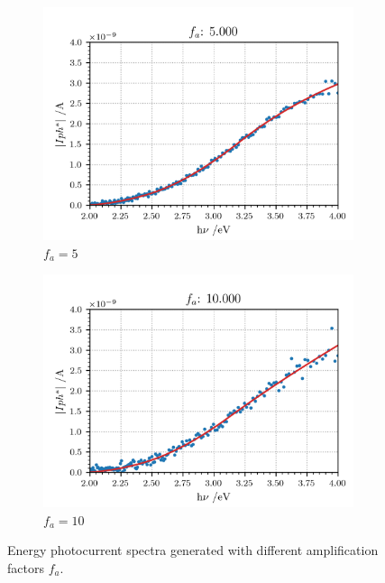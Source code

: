\documentclass[10pt, 3p, sort&compress]{elsarticle}
\newcommand{\coef}{0.1}
\begin{document}
\begin{figure}[htbp]
	\begin{subfigure}{\coef\textwidth}
		\centering
	 	\includegraphics[width=\textwidth]{DSS_0mV_data-Iph-5x.png}
	 	\caption{$f_a=5$}
	 	\label{fig:fa5}
	\end{subfigure}\quad
	\begin{subfigure}{\coef\textwidth}
		\centering
	 	\includegraphics[width=\textwidth]{DSS_0mV_data-Iph-10x.png}
	 	\caption{$f_a=10$}
	 	\label{fig:fa10}
	\end{subfigure}
	\caption{Energy photocurrent spectra generated with different amplification factors $f_a$.}
	\label{fig:data_noise}
\end{figure}
\end{document}
